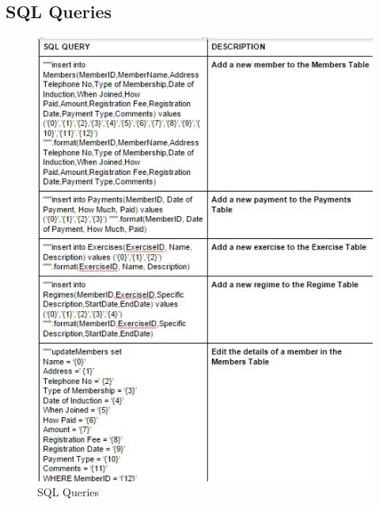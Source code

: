 \begin{itemize}
\subsection{SQL Queries}

\begin{figure}[H]
    \includegraphics[width=\textwidth]{Queries1.JPG}
    \caption{SQL Queries} \label{fig:SQL Queries}
\end{figure}


\end{itemize}
